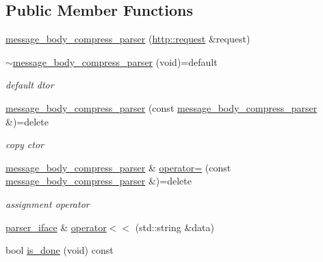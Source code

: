 \subsection*{Public Member Functions}
\begin{DoxyCompactItemize}
\item 
\hyperlink{classnetflex_1_1parsing_1_1message__body__compress__parser_a6cd3e2a01694e42f973640fa144e58e1}{message\+\_\+body\+\_\+compress\+\_\+parser} (\hyperlink{classnetflex_1_1http_1_1request}{http\+::request} \&request)
\item 
\mbox{\label{classnetflex_1_1parsing_1_1message__body__compress__parser_aff3e9be8dfd78d48a28a9f5dadbb008c}} 
\hyperlink{classnetflex_1_1parsing_1_1message__body__compress__parser_aff3e9be8dfd78d48a28a9f5dadbb008c}{$\sim$message\+\_\+body\+\_\+compress\+\_\+parser} (void)=default
\begin{DoxyCompactList}\small\item\em default dtor \end{DoxyCompactList}\item 
\mbox{\label{classnetflex_1_1parsing_1_1message__body__compress__parser_a1d5e498f4b6ff6dfaaebc44a5548a429}} 
\hyperlink{classnetflex_1_1parsing_1_1message__body__compress__parser_a1d5e498f4b6ff6dfaaebc44a5548a429}{message\+\_\+body\+\_\+compress\+\_\+parser} (const \hyperlink{classnetflex_1_1parsing_1_1message__body__compress__parser}{message\+\_\+body\+\_\+compress\+\_\+parser} \&)=delete
\begin{DoxyCompactList}\small\item\em copy ctor \end{DoxyCompactList}\item 
\mbox{\label{classnetflex_1_1parsing_1_1message__body__compress__parser_ab03ca2e5af5f21b934f020c661ad6ac1}} 
\hyperlink{classnetflex_1_1parsing_1_1message__body__compress__parser}{message\+\_\+body\+\_\+compress\+\_\+parser} \& \hyperlink{classnetflex_1_1parsing_1_1message__body__compress__parser_ab03ca2e5af5f21b934f020c661ad6ac1}{operator=} (const \hyperlink{classnetflex_1_1parsing_1_1message__body__compress__parser}{message\+\_\+body\+\_\+compress\+\_\+parser} \&)=delete
\begin{DoxyCompactList}\small\item\em assignment operator \end{DoxyCompactList}\item 
\hyperlink{classnetflex_1_1parsing_1_1parser__iface}{parser\+\_\+iface} \& \hyperlink{classnetflex_1_1parsing_1_1message__body__compress__parser_ae8a77a83553e646915d0eed3ef25684c}{operator$<$$<$} (std\+::string \&data)
\item 
bool \hyperlink{classnetflex_1_1parsing_1_1message__body__compress__parser_ad963822a3d7ae17704fd7732925837f9}{is\+\_\+done} (void) const
\end{DoxyCompactItemize}
